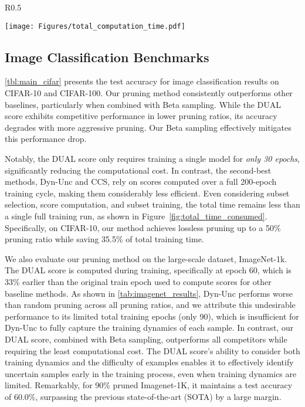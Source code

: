 \begin{wrapfigure}[16]{R}{0.5\textwidth}
\vspace{-15pt}
    \begin{center}
        \texttt{[image: Figures/total\_computation\_time.pdf]}
    \end{center}
    \vspace{-8pt}
    \caption{Comparison in total time spent on CIFAR datasets.}
    \label{fig:total_time_consumed}
\end{wrapfigure}
\vspace{3pt}
\subsection{Image Classification Benchmarks}
\cref{tbl:main_cifar} presents the test accuracy for image classification results on CIFAR-10 and CIFAR-100. Our pruning method consistently outperforms other baselines, particularly when combined with Beta sampling. While the DUAL score exhibits competitive performance in lower pruning ratios, its accuracy degrades with more aggressive pruning. Our Beta sampling effectively mitigates this performance drop.

Notably, the DUAL score only requires training a single model for \emph{only 30 epochs}, significantly reducing the computational cost. In contrast, the second-best methods, Dyn-Unc and CCS, rely on scores computed over a full 200-epoch training cycle, making them considerably less efficient. Even considering subset selection, score computation, and subset training, the total time remains less than a single full training run, as shown in Figure~\ref{fig:total_time_consumed}. Specifically, on CIFAR-10, our method achieves lossless pruning up to a 50\% pruning ratio while saving 35.5\% of total training time. 


\vspace{2pt}
We also evaluate our pruning method on the large-scale dataset, ImageNet-1k. The DUAL score is computed during training, specifically at epoch 60, which is 33\% earlier than the original train epoch used to compute scores for other baseline methods. As shown in \cref{tab:imagenet_results}, Dyn-Unc performs worse than random pruning across all pruning ratios, and we attribute this undesirable performance to its limited total training epochs (only 90), which is insufficient for Dyn-Unc to fully capture the training dynamics of each sample. In contrast, our DUAL score, combined with Beta sampling, outperforms all competitors while requiring the least computational cost. The DUAL score's ability to consider both training dynamics and the difficulty of examples enables it to effectively identify uncertain samples early in the training process, even when training dynamics are limited. Remarkably, for 90\% pruned Imagenet-1K, it maintains a test accuracy of 60.0\%, surpassing the previous state-of-the-art (SOTA) by a large margin.
\vspace{15pt}
